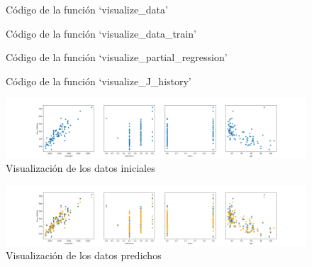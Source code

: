 \documentclass[6pt]{AiTex}
\begin{document}
\begin{figure}[H]
    \centering
    
    \caption{Código de la función `visualize\_data'}
    \label{fig:visualize_data}
\end{figure}

\begin{figure}[H]
    \centering
    
    \caption{Código de la función `visualize\_data\_train'}
    \label{fig:visualize_data_train}
\end{figure}

\begin{figure}[H]
    \centering
    
    \caption{Código de la función `visualize\_partial\_regression'}
    \label{fig:visualize_partial_reggression}
\end{figure}

\begin{figure}[H]
    \centering
    
    \caption{Código de la función `visualize\_J\_history'}
    \label{fig:visualize_J_history}
\end{figure}

\begin{figure}[H]
    \centering
    \includegraphics[width=\textwidth]{./images/visualizacion_inicial.png}
    \caption{Visualización de los datos iniciales}
    \label{fig:data}
\end{figure}

\begin{figure}[H]
    \centering
    \includegraphics[width=\textwidth]{./images/predicted_data.png}
    \caption{Visualización de los datos predichos}
    \label{fig:data_train}
\end{figure}
\end{document}
